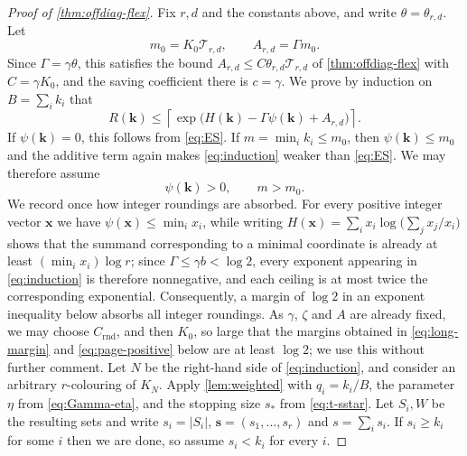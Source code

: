 \documentclass[11pt]{article}
\theoremstyle{definition}
\newcommand{\kk}{\mathbf k}
\newcommand{\ssv}{\mathbf s}
\newcommand{\Ent}{H}
\newcommand{\pot}{\psi}
\begin{document}
\begin{proof}[Proof of \cref{thm:offdiag-flex}]
Fix $r,d$ and the constants above, and write
$\theta=\theta_{r,d}$.  Let
\[
 m_0=K_0\mathcal T_{r,d},
 \qquad
 A_{r,d}=\Gamma m_0.
\]
Since $\Gamma=\gamma\theta$, this satisfies the bound
$A_{r,d}\le C\theta_{r,d}\mathcal T_{r,d}$ of \cref{thm:offdiag-flex} with
$C=\gamma K_0$, and the saving coefficient there is $c=\gamma$.  We prove by
induction on $B=\sum_i k_i$ that
\begin{equation}\label{eq:induction}
 R(\kk)\le
 \left\lceil\exp\bigl(\Ent(\kk)-\Gamma\pot(\kk)+A_{r,d}\bigr)\right\rceil.
\end{equation}
If $\pot(\kk)=0$, this follows from \eqref{eq:ES}.  If
$m=\min_i k_i\le m_0$, then $\pot(\kk)\le m_0$ and the additive term again
makes \eqref{eq:induction} weaker than \eqref{eq:ES}.  We may therefore assume
\[
 \pot(\kk)>0,
 \qquad m>m_0.
\]
We record once how integer roundings are absorbed.  For every positive
integer vector $\mathbf x$ we have $\pot(\mathbf x)\le\min_ix_i$, while
writing $\Ent(\mathbf x)=\sum_ix_i\log\bigl(\sum_jx_j/x_i\bigr)$ shows that
the summand corresponding to a minimal coordinate is already at least
$(\min_ix_i)\log r$; since $\Gamma\le\gamma b<\log2$, every exponent
appearing in \eqref{eq:induction} is therefore nonnegative, and each ceiling
is at most twice the corresponding exponential.  Consequently, a margin of
$\log2$ in an exponent inequality below absorbs all integer roundings.  As
$\gamma$, $\zeta$ and $A$ are already fixed, we may choose
$C_{\mathrm{rnd}}$, and then $K_0$, so large that the margins obtained in
\eqref{eq:long-margin} and \eqref{eq:page-positive} below are at least
$\log2$; we use this without further comment.
Let $N$ be the right-hand side of \eqref{eq:induction}, and consider an
arbitrary $r$-colouring of $K_N$.  Apply \cref{lem:weighted} with
$q_i=k_i/B$, the parameter $\eta$ from \eqref{eq:Gamma-eta}, and the stopping
size $s_\ast$ from \eqref{eq:t-sstar}.  Let $S_i,W$ be the resulting sets and
write $s_i=|S_i|$, $\ssv=(s_1,\ldots,s_r)$ and $s=\sum_i s_i$.  If $s_i\ge k_i$ for some $i$ then we are
done, so assume $s_i<k_i$ for every $i$.


\end{proof}
\end{document}
